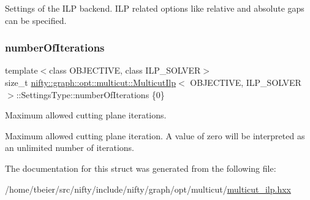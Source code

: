Settings of the I\+LP backend.  I\+LP related options like relative and absolute gaps can be specified. 

\mbox{\label{structnifty_1_1graph_1_1opt_1_1multicut_1_1MulticutIlp_1_1SettingsType_afa45b6db286d8000398eff9f719fc5dd}} 
\subsubsection{\texorpdfstring{number\+Of\+Iterations}{numberOfIterations}}
{\footnotesize\ttfamily template$<$class O\+B\+J\+E\+C\+T\+I\+VE, class I\+L\+P\+\_\+\+S\+O\+L\+V\+ER$>$ \\
size\+\_\+t \hyperlink{classnifty_1_1graph_1_1opt_1_1multicut_1_1MulticutIlp}{nifty\+::graph\+::opt\+::multicut\+::\+Multicut\+Ilp}$<$ O\+B\+J\+E\+C\+T\+I\+VE, I\+L\+P\+\_\+\+S\+O\+L\+V\+ER $>$\+::Settings\+Type\+::number\+Of\+Iterations \{0\}}



Maximum allowed cutting plane iterations. 

Maximum allowed cutting plane iteration. A value of zero will be interpreted as an unlimited number of iterations. 

The documentation for this struct was generated from the following file\+:\begin{DoxyCompactItemize}
\item 
/home/tbeier/src/nifty/include/nifty/graph/opt/multicut/\hyperlink{multicut__ilp_8hxx}{multicut\+\_\+ilp.\+hxx}\end{DoxyCompactItemize}
